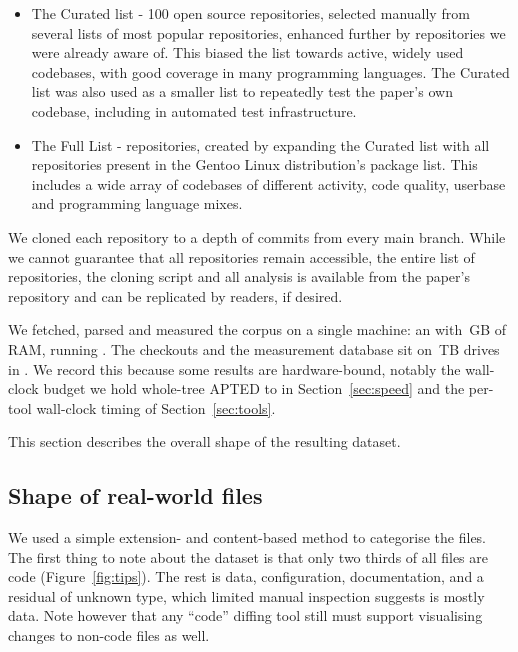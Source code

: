 \documentclass[sigconf]{acmart}
\begin{document}
\begin{itemize}
  \item The Curated list - 100 open source repositories, selected manually from several lists of
    most popular repositories, enhanced further by repositories we were already aware of. This biased the list towards active, widely used codebases, with good coverage in
    many programming languages. The Curated list was also used as a smaller list to repeatedly
    test the paper's own codebase, including in automated test infrastructure.
  \item The Full List - \NumRepos{} repositories, created by expanding the Curated list
    with all repositories present in the Gentoo Linux distribution's package list. This includes
    a wide array of codebases of different activity, code quality, userbase and programming language
    mixes.
\end{itemize}

We cloned each repository to a depth of \CorpusCloneDepth{} commits from every main branch. While we cannot guarantee that all repositories
remain accessible, the entire list of repositories, the cloning script and all analysis is available from the paper's repository and can be replicated by readers, if desired.

We fetched, parsed and measured the corpus on a single machine: an \MachineCpu{} with \MachineRamGb{}\,GB of RAM, running \MachineOs{}. The checkouts and the measurement database sit on \MachineDiskCount{} \MachineDiskSizeTb{}\,TB \MachineDiskModel{} drives in \MachineDiskArray{}. We record this because some results are hardware-bound, notably the wall-clock budget we hold whole-tree APTED to in Section~\ref{sec:speed} and the per-tool wall-clock timing of Section~\ref{sec:tools}.

This section describes the overall shape of the resulting dataset.

\subsection{Shape of real-world files}

We used a simple extension- and content-based method to categorise the files. The first thing to note about the dataset is that only two thirds of all files are code (Figure~\ref{fig:tips}). The rest is data, configuration, documentation, and a residual of unknown type, which limited manual inspection suggests is mostly data. Note however that any ``code'' diffing tool still must support visualising changes to non-code files as well.
\end{document}
